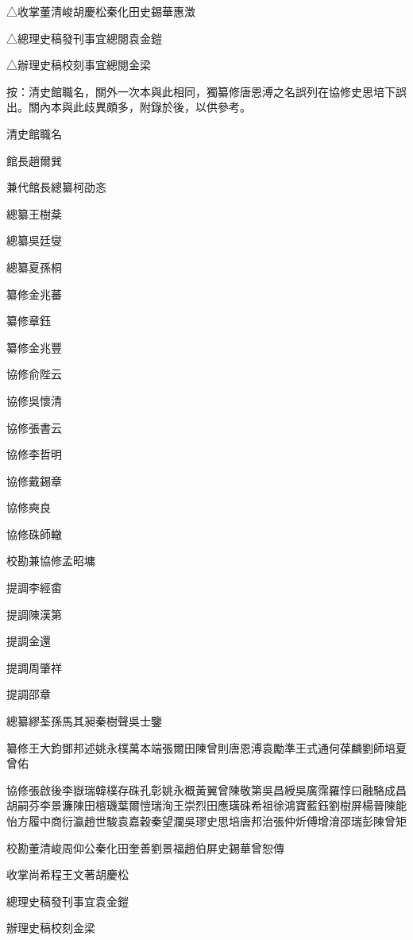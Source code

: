 \begin{pinyinscope}
△收掌董清峻胡慶松秦化田史錫華惠澂

△總理史稿發刊事宜總閱袁金鎧

△辦理史稿校刻事宜總閱金梁

按：清史館職名，關外一次本與此相同，獨纂修唐恩溥之名誤列在協修史思培下誤出。關內本與此歧異頗多，附錄於後，以供參考。

清史館職名

館長趙爾巽

兼代館長總纂柯劭忞

總纂王樹棻

總纂吳廷燮

總纂夏孫桐

纂修金兆蕃

纂修章鈺

纂修金兆豐

協修俞陛云

協修吳懷清

協修張書云

協修李哲明

協修戴錫章

協修奭良

協修硃師轍

校勘兼協修孟昭墉

提調李經畬

提調陳漢第

提調金還

提調周肇祥

提調邵章

總纂繆荃孫馬其昶秦樹聲吳士鑒

纂修王大鈞鄧邦述姚永樸萬本端張爾田陳曾則唐恩溥袁勵準王式通何葆麟劉師培夏曾佑

協修張啟後李嶽瑞韓樸存硃孔彰姚永概黃翼曾陳敬第吳昌綬吳廣霈羅惇曰融駱成昌胡嗣芬李景濂陳田檀璣葉爾愷瑞洵王崇烈田應璜硃希祖徐鴻寶藍鈺劉樹屏楊晉陳能怡方履中商衍瀛趙世駿袁嘉穀秦望瀾吳璆史思培唐邦治張仲炘傅增淯邵瑞彭陳曾矩

校勘董清峻周仰公秦化田奎善劉景福趙伯屏史錫華曾恕傳

收掌尚希程王文著胡慶松

總理史稿發刊事宜袁金鎧

辦理史稿校刻金梁


\end{pinyinscope}